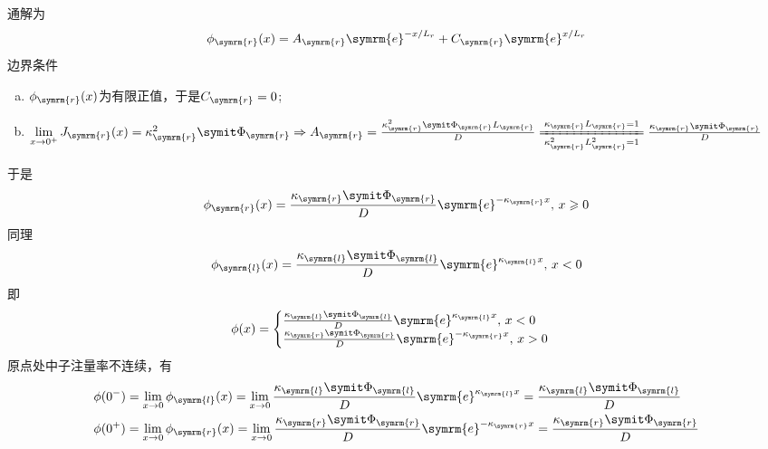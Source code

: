 \begin{exercise}
\begin{solution}
\begin{enumerate}[(1)]
\begin{equation*}
            \end{equation*}
            通解为
            \begin{equation*}
                \phi_{\symrm{r}}(x) = A_{\symrm{r}} \symrm{e}^{-x/L_r} + C_{\symrm{r}} \symrm{e}^{x/L_r}
            \end{equation*}
            边界条件
            \begin{enumerate}[(a)]
                \item $\phi_{\symrm{r}}(x)$为有限正值，于是$C_{\symrm{r}} = 0$;
                \item $\lim\limits_{x\to 0^{+}} J_{\symrm{r}}(x) = \kappa_{\symrm{r}}^2 \vPhi_{\symrm{r}} \Rightarrow A_{\symrm{r}} = \frac{\kappa_{\symrm{r}}^2 \vPhi_{\symrm{r}} L_{\symrm{r}}}{D} \xlongequal[\kappa_{\symrm{r}}^2 L_{\symrm{r}}^2 = 1]{\kappa_{\symrm{r}} L_{\symrm{r}} = 1} \frac{\kappa_{\symrm{r}} \vPhi_{\symrm{r}}}{D}$
            \end{enumerate}
            于是
            \begin{equation*}
                \phi_{\symrm{r}}(x) = \frac{\kappa_{\symrm{r}} \vPhi_{\symrm{r}}}{D} \symrm{e}^{-\kappa_{\symrm{r}}x},\,x\geqslant 0
            \end{equation*}
            同理
            \begin{equation*}
                \phi_{\symrm{l}}(x) = \frac{\kappa_{\symrm{l}} \vPhi_{\symrm{l}}}{D} \symrm{e}^{\kappa_{\symrm{l}}x},\,x < 0
            \end{equation*}
            即
            \begin{equation*}
                \phi(x) = \begin{cases}
                    \frac{\kappa_{\symrm{l}} \vPhi_{\symrm{l}}}{D} \symrm{e}^{\kappa_{\symrm{l}}x},\,x < 0 \\
                    \frac{\kappa_{\symrm{r}} \vPhi_{\symrm{r}}}{D} \symrm{e}^{-\kappa_{\symrm{r}}x},\,x > 0
                \end{cases}
            \end{equation*}
            原点处中子注量率不连续，有
            \begin{align*}
                &\phi(0^{-}) = \lim_{x \to 0} \phi_{\symrm{l}}(x) = \lim_{x \to 0} \frac{\kappa_{\symrm{l}} \vPhi_{\symrm{l}}}{D} \symrm{e}^{\kappa_{\symrm{l}}x} = \frac{\kappa_{\symrm{l}} \vPhi_{\symrm{l}}}{D} \\
                &\phi(0^{+}) = \lim_{x \to 0} \phi_{\symrm{r}}(x) = \lim_{x \to 0} \frac{\kappa_{\symrm{r}} \vPhi_{\symrm{r}}}{D} \symrm{e}^{-\kappa_{\symrm{r}}x} = \frac{\kappa_{\symrm{r}} \vPhi_{\symrm{r}}}{D}

\end{align*}
\end{enumerate}
\end{solution}
\end{exercise}
